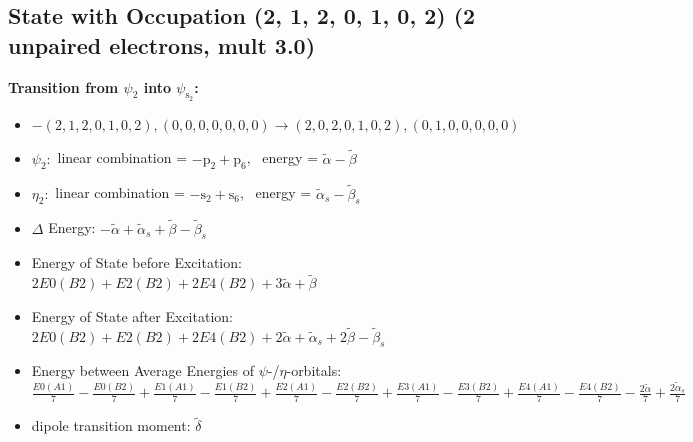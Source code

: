 \documentclass[12pt,a4paper]{article}
\begin{document}
\subsection*{State with Occupation (2, 1, 2, 0, 1, 0, 2) (2 unpaired electrons, mult 3.0)}
        \noindent\textbf{Transition from $\psi_{2}$ into $\psi_{\text{s}_{2}}$:}
        \begin{itemize}
            \item $- (2, 1, 2, 0, 1, 0, 2), (0, 0, 0, 0, 0, 0, 0) \rightarrow (2, 0, 2, 0, 1, 0, 2), (0, 1, 0, 0, 0, 0, 0)$
        
            \item $\psi_{2}:$ linear combination = $- \text{p}_{2} + \text{p}_{6}$, \
            energy = $\tilde{\alpha} - \tilde{\beta}$
            
            \item $\eta_{2}:$ linear combination = $- \text{s}_{2} + \text{s}_{6}$, \
            energy = $\tilde{\alpha}_{s} - \tilde{\beta}_{s}$
            
                \item $\Delta$ Energy: $- \tilde{\alpha} + \tilde{\alpha}_{s} + \tilde{\beta} - \tilde{\beta}_{s}$
                \item Energy of State before Excitation: $2 E0(B2) + E2(B2) + 2 E4(B2) + 3 \tilde{\alpha} + \tilde{\beta}$
                \item Energy of State after Excitation: $2 E0(B2) + E2(B2) + 2 E4(B2) + 2 \tilde{\alpha} + \tilde{\alpha}_{s} + 2 \tilde{\beta} - \tilde{\beta}_{s}$
                \item Energy between Average Energies of $\psi$-/$\eta$-orbitals: $\frac{E0(A1)}{7} - \frac{E0(B2)}{7} + \frac{E1(A1)}{7} - \frac{E1(B2)}{7} + \frac{E2(A1)}{7} - \frac{E2(B2)}{7} + \frac{E3(A1)}{7} - \frac{E3(B2)}{7} + \frac{E4(A1)}{7} - \frac{E4(B2)}{7} - \frac{2 \tilde{\alpha}}{7} + \frac{2 \tilde{\alpha}_{s}}{7}$
            
            \item dipole transition moment: $\tilde{\delta}$
        
        \end{itemize}
        
\end{document}
